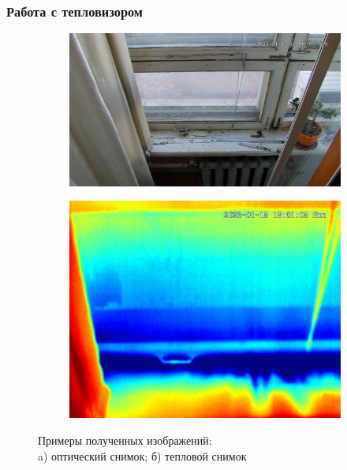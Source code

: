 \documentclass[t]{beamer}
\begin{document}
	\begin{frame}
		\frametitle{Работа с тепловизором}
		\vspace{1cm}
		\begin{figure}[ht!]
			\begin{subfigure}{0.5\textwidth}
				\centering
				\includegraphics[width = \textwidth]{image/chapter_2/opt_example}
				\caption{}
			\end{subfigure}
			\begin{subfigure}{0.3\textwidth}
				\centering
				\includegraphics[width = \textwidth]{image/chapter_2/tep_example}
				\caption{}
			\end{subfigure}
			\centering
			\caption{Примеры полученных изображений: \\a) оптический снимок; б) тепловой снимок}
			\label{fig:Examples}
		\end{figure}
	\end{frame}
\end{document}
